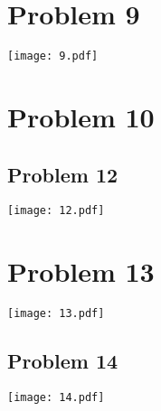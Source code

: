 \documentclass[a4paper, 8]{article}
\begin{document}
\section*{Problem 9}


\texttt{[image: 9.pdf]}

\section*{Problem 10}



\begin{samepage}
\section*{Problem 12}


\texttt{[image: 12.pdf]}
\end{samepage}

\section*{Problem 13}


\texttt{[image: 13.pdf]}

\begin{samepage}
\section*{Problem 14}



\texttt{[image: 14.pdf]}
\end{samepage}
\end{document}
